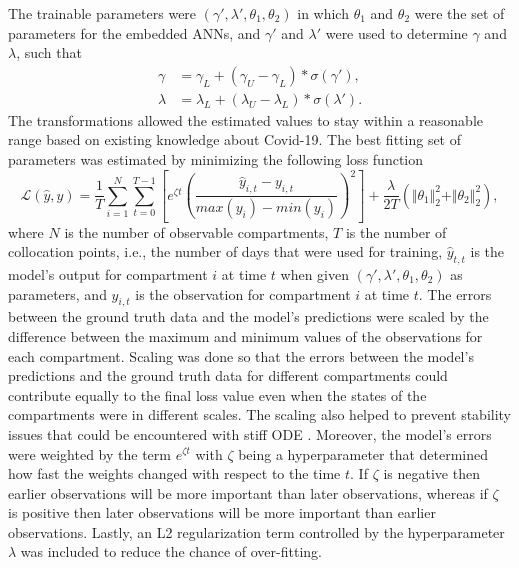 The trainable parameters were $(\gamma', \lambda', \theta_1, \theta_2)$ in which $\theta_1$ and $\theta_2$ were the set of parameters for the embedded \glspl{ANN}, and $\gamma'$ and $\lambda'$ were used to determine $\gamma$ and $\lambda$, such that
\begin{align*}
    \gamma &= \gamma_L + (\gamma_U - \gamma_L) * \sigma (\gamma'), \\
    \lambda &= \lambda_L + (\lambda_U - \lambda_L) * \sigma (\lambda').
\end{align*}
The transformations allowed the estimated values to stay within a reasonable range based on existing knowledge about Covid-19.
The best fitting set of parameters was estimated by minimizing the following loss function
\begin{equation}
    \mathcal{L}(\hat{y}, y) = \frac{1}{T} \sum_{i=1}^N \sum_{t=0}^{T-1} \left[ e^{\zeta t} \left(\frac{\hat{y}_{i,t} - y_{i,t}}{max(y_i) - min(y_i)}\right)^2\right] + \frac{\lambda}{2T} (\Vert\theta_1\Vert^2_2 + \Vert\theta_2\Vert^2_2),
    \label{eq:ude-model-loss}
\end{equation}
where $N$ is the number of observable compartments, $T$ is the number of collocation points, i.e., the number of days that were used for training, $\hat{y}_{t,t}$ is the model's output for compartment $i$ at time $t$ when given $(\gamma', \lambda', \theta_1, \theta_2)$ as parameters, and $y_{i,t}$ is the observation for compartment $i$ at time $t$.
The errors between the ground truth data and the model's predictions were scaled by the difference between the maximum and minimum values of the observations for each compartment.
Scaling was done so that the errors between the model's predictions and the ground truth data for different compartments could contribute equally to the final loss value even when the states of the compartments were in different scales.
The scaling also helped to prevent stability issues that could be encountered with stiff \gls{ODE} \cite{kimStiffNeuralOrdinary2021}.
Moreover, the model's errors were weighted by the term $e^{\zeta t}$ with $\zeta$ being a hyperparameter that determined how fast the weights changed with respect to the time $t$.
If $\zeta$ is negative then earlier observations will be more important than later observations, whereas if $\zeta$ is positive then later observations will be more important than earlier observations.
Lastly, an L2 regularization term controlled by the hyperparameter $\lambda$ was included to reduce the chance of over-fitting.

